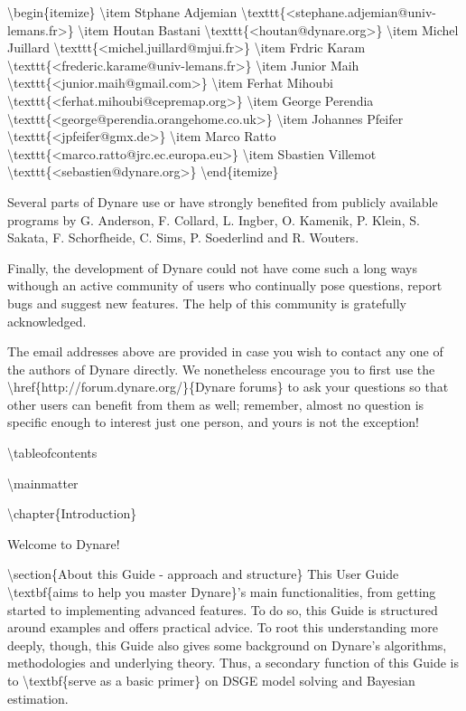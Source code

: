 \documentclass[10pt,math=newtx,citestyle=gb7714-2015,bibstyle=gb7714-2015]{elegantbook}
\begin{document}
	\textbackslash{}begin\{itemize\}
	\textbackslash{}item Stphane Adjemian \textbackslash{}texttt\{<stephane.adjemian@univ-lemans.fr>\}
	\textbackslash{}item Houtan Bastani \textbackslash{}texttt\{<houtan@dynare.org>\}
	\textbackslash{}item Michel Juillard \textbackslash{}texttt\{<michel.juillard@mjui.fr>\}
	\textbackslash{}item Frdric Karam \textbackslash{}texttt\{<frederic.karame@univ-lemans.fr>\}
	\textbackslash{}item Junior Maih \textbackslash{}texttt\{<junior.maih@gmail.com>\}
	\textbackslash{}item Ferhat Mihoubi \textbackslash{}texttt\{<ferhat.mihoubi@cepremap.org>\}
	\textbackslash{}item George Perendia \textbackslash{}texttt\{<george@perendia.orangehome.co.uk>\}
	\textbackslash{}item Johannes Pfeifer \textbackslash{}texttt\{<jpfeifer@gmx.de>\}
	\textbackslash{}item Marco Ratto \textbackslash{}texttt\{<marco.ratto@jrc.ec.europa.eu>\}
	\textbackslash{}item Sbastien Villemot \textbackslash{}texttt\{<sebastien@dynare.org>\}
	\textbackslash{}end\{itemize\}
	
	Several parts of Dynare use or have strongly benefited from publicly available programs by G. Anderson, F. Collard, L. Ingber, O. Kamenik, P. Klein, S. Sakata, F. Schorfheide, C. Sims, P. Soederlind and R. Wouters.
	
	Finally, the development of Dynare could not have come such a long ways withough an active community of users who continually pose questions, report bugs and suggest new features. The help of this community is gratefully acknowledged.
	
	The email addresses above are provided in case you wish to contact any one of the authors of Dynare directly. We nonetheless encourage you to first use the \textbackslash{}href\{http://forum.dynare.org/\}\{Dynare forums\} to ask your questions so that other users can benefit from them as well; remember, almost no question is specific enough to interest just one person, and yours is not the exception!
	
	\textbackslash{}tableofcontents
	
	\textbackslash{}mainmatter
	
	\textbackslash{}chapter\{Introduction\}
	
	Welcome to Dynare! 
	
	\textbackslash{}section\{About this Guide - approach and structure\}
	This User Guide \textbackslash{}textbf\{aims to help you master Dynare\}'s main functionalities, from getting started to implementing advanced features. To do so, this Guide is structured around examples and offers practical advice. To root this understanding more deeply, though, this Guide also gives some background on Dynare's algorithms, methodologies and underlying theory. Thus, a secondary function of this Guide is to \textbackslash{}textbf\{serve as a basic primer\} on DSGE model solving and Bayesian estimation. 
	
\end{document}
